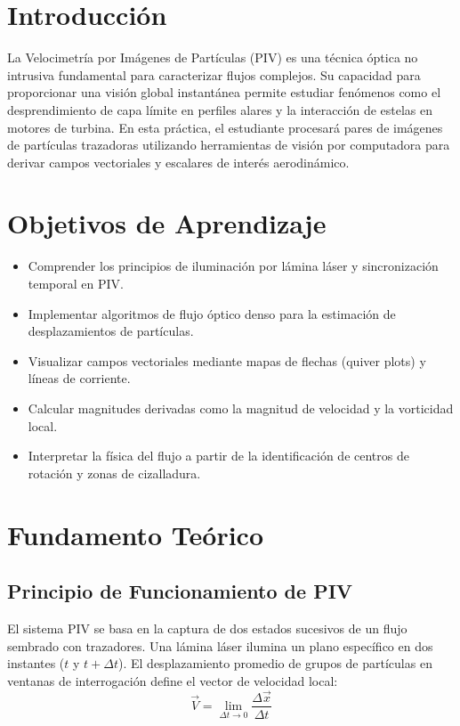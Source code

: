\documentclass[11pt, a4paper]{article}
\begin{document}
\section{Introducción}
La Velocimetría por Imágenes de Partículas (PIV) es una técnica óptica no intrusiva fundamental para caracterizar flujos complejos. Su capacidad para proporcionar una visión global instantánea permite estudiar fenómenos como el desprendimiento de capa límite en perfiles alares y la interacción de estelas en motores de turbina. En esta práctica, el estudiante procesará pares de imágenes de partículas trazadoras utilizando herramientas de visión por computadora para derivar campos vectoriales y escalares de interés aerodinámico.

\section{Objetivos de Aprendizaje}
\begin{itemize}[label=-]
    \item Comprender los principios de iluminación por lámina láser y sincronización temporal en PIV.
    \item Implementar algoritmos de flujo óptico denso para la estimación de desplazamientos de partículas.
    \item Visualizar campos vectoriales mediante mapas de flechas (quiver plots) y líneas de corriente.
    \item Calcular magnitudes derivadas como la magnitud de velocidad y la vorticidad local.
    \item Interpretar la física del flujo a partir de la identificación de centros de rotación y zonas de cizalladura.
\end{itemize}

\section{Fundamento Teórico}

\subsection{Principio de Funcionamiento de PIV}
El sistema PIV se basa en la captura de dos estados sucesivos de un flujo sembrado con trazadores. Una lámina láser ilumina un plano específico en dos instantes ($t$ y $t+\Delta t$). El desplazamiento promedio de grupos de partículas en ventanas de interrogación define el vector de velocidad local:
\begin{equation}
    \vec{V} = \lim_{\Delta t \to 0} \frac{\Delta \vec{x}}{\Delta t}
\end{equation}
\end{document}
